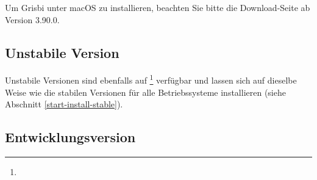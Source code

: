 Um Grisbi unter macOS zu installieren, beachten Sie bitte die Download-Seite ab Version 3.90.0.%

\subsection{Unstabile Version\label{start-install-instable}}

Unstabile Versionen sind ebenfalls auf \footnote{\urlSourceForgeGrisbiInstable} verfügbar und lassen sich auf dieselbe Weise wie die stabilen Versionen für alle Betriebssysteme installieren (siehe Abschnitt \vref{start-install-stable}).

\subsection{Entwicklungsversion\label{start-install-devel}}

